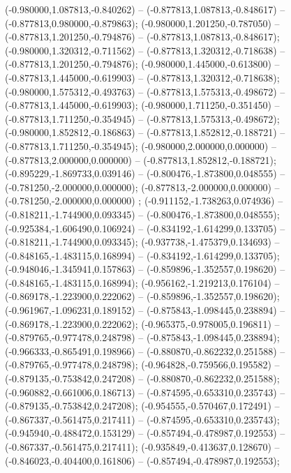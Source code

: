  (-0.980000,1.087813,-0.840262) -- (-0.877813,1.087813,-0.848617) -- (-0.877813,0.980000,-0.879863);
 (-0.980000,1.201250,-0.787050) -- (-0.877813,1.201250,-0.794876) -- (-0.877813,1.087813,-0.848617);
 (-0.980000,1.320312,-0.711562) -- (-0.877813,1.320312,-0.718638) -- (-0.877813,1.201250,-0.794876);
 (-0.980000,1.445000,-0.613800) -- (-0.877813,1.445000,-0.619903) -- (-0.877813,1.320312,-0.718638);
 (-0.980000,1.575312,-0.493763) -- (-0.877813,1.575313,-0.498672) -- (-0.877813,1.445000,-0.619903);
 (-0.980000,1.711250,-0.351450) -- (-0.877813,1.711250,-0.354945) -- (-0.877813,1.575313,-0.498672);
 (-0.980000,1.852812,-0.186863) -- (-0.877813,1.852812,-0.188721) -- (-0.877813,1.711250,-0.354945);
 (-0.980000,2.000000,0.000000) -- (-0.877813,2.000000,0.000000) -- (-0.877813,1.852812,-0.188721);
 (-0.895229,-1.869733,0.039146) -- (-0.800476,-1.873800,0.048555) -- (-0.781250,-2.000000,0.000000);
 (-0.877813,-2.000000,0.000000) -- (-0.781250,-2.000000,0.000000) ;
 (-0.911152,-1.738263,0.074936) -- (-0.818211,-1.744900,0.093345) -- (-0.800476,-1.873800,0.048555);
 (-0.925384,-1.606490,0.106924) -- (-0.834192,-1.614299,0.133705) -- (-0.818211,-1.744900,0.093345);
 (-0.937738,-1.475379,0.134693) -- (-0.848165,-1.483115,0.168994) -- (-0.834192,-1.614299,0.133705);
 (-0.948046,-1.345941,0.157863) -- (-0.859896,-1.352557,0.198620) -- (-0.848165,-1.483115,0.168994);
 (-0.956162,-1.219213,0.176104) -- (-0.869178,-1.223900,0.222062) -- (-0.859896,-1.352557,0.198620);
 (-0.961967,-1.096231,0.189152) -- (-0.875843,-1.098445,0.238894) -- (-0.869178,-1.223900,0.222062);
 (-0.965375,-0.978005,0.196811) -- (-0.879765,-0.977478,0.248798) -- (-0.875843,-1.098445,0.238894);
 (-0.966333,-0.865491,0.198966) -- (-0.880870,-0.862232,0.251588) -- (-0.879765,-0.977478,0.248798);
 (-0.964828,-0.759566,0.195582) -- (-0.879135,-0.753842,0.247208) -- (-0.880870,-0.862232,0.251588);
 (-0.960882,-0.661006,0.186713) -- (-0.874595,-0.653310,0.235743) -- (-0.879135,-0.753842,0.247208);
 (-0.954555,-0.570467,0.172491) -- (-0.867337,-0.561475,0.217411) -- (-0.874595,-0.653310,0.235743);
 (-0.945940,-0.488472,0.153129) -- (-0.857494,-0.478987,0.192553) -- (-0.867337,-0.561475,0.217411);
 (-0.935849,-0.413637,0.128670) -- (-0.846023,-0.404400,0.161806) -- (-0.857494,-0.478987,0.192553);
